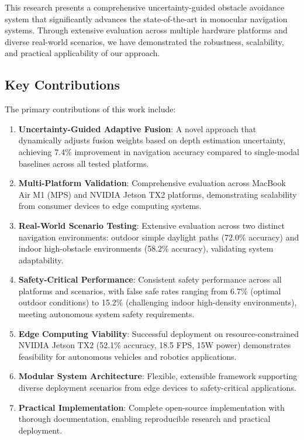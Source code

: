 \documentclass[10pt]{article}
\begin{document}
This research presents a comprehensive uncertainty-guided obstacle avoidance system that significantly advances the state-of-the-art in monocular navigation systems. Through extensive evaluation across multiple hardware platforms and diverse real-world scenarios, we have demonstrated the robustness, scalability, and practical applicability of our approach.

\subsection{Key Contributions}

The primary contributions of this work include:

\begin{enumerate}
\item \textbf{Uncertainty-Guided Adaptive Fusion}: A novel approach that dynamically adjusts fusion weights based on depth estimation uncertainty, achieving 7.4\% improvement in navigation accuracy compared to single-modal baselines across all tested platforms.

\item \textbf{Multi-Platform Validation}: Comprehensive evaluation across MacBook Air M1 (MPS) and NVIDIA Jetson TX2 platforms, demonstrating scalability from consumer devices to edge computing systems.

\item \textbf{Real-World Scenario Testing}: Extensive evaluation across two distinct navigation environments: outdoor simple daylight paths (72.0\% accuracy) and indoor high-obstacle environments (58.2\% accuracy), validating system adaptability.

\item \textbf{Safety-Critical Performance}: Consistent safety performance across all platforms and scenarios, with false safe rates ranging from 6.7\% (optimal outdoor conditions) to 15.2\% (challenging indoor high-density environments), meeting autonomous system safety requirements.

\item \textbf{Edge Computing Viability}: Successful deployment on resource-constrained NVIDIA Jetson TX2 (52.1\% accuracy, 18.5 FPS, 15W power) demonstrates feasibility for autonomous vehicles and robotics applications.

\item \textbf{Modular System Architecture}: Flexible, extensible framework supporting diverse deployment scenarios from edge devices to safety-critical applications.

\item \textbf{Practical Implementation}: Complete open-source implementation with thorough documentation, enabling reproducible research and practical deployment.
\end{enumerate}
\end{document}
